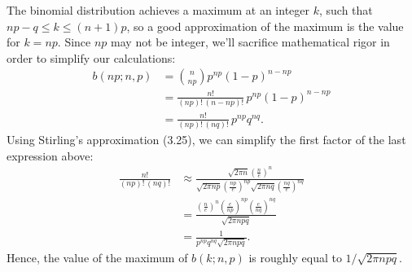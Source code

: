 The binomial distribution achieves a maximum at an integer $k$, such that $np-q\le k\le(n+1)p$, so a good approximation of the maximum is the value for $k=np$.
Since $np$ may not be integer, we'll sacrifice mathematical rigor in order to simplify our calculations:
\begin{align*}
    b(np;n,p) &= \binom{n}{np}p^{np}(1-p)^{n-np} \\
    &= \frac{n!}{(np)!\,(n-np)!}\,p^{np}(1-p)^{n-np} \\[1mm]
    &= \frac{n!}{(np)!\,(nq)!}\,p^{np}q^{nq}.
\end{align*}
Using Stirling's approximation (3.25), we can simplify the first factor of the last expression above:
\begin{align*}
    \frac{n!}{(np)!\,(nq)!} &\approx \frac{\sqrt{2\pi n}\left(\frac{n}{e}\right)^n}{\sqrt{2\pi np}\left(\frac{np}{e}\right)^{np}\sqrt{2\pi nq}\left(\frac{nq}{e}\right)^{nq}} \\[1mm]
    &= \frac{\left(\frac{n}{e}\right)^n\left(\frac{e}{np}\right)^{np}\left(\frac{e}{nq}\right)^{nq}}{\sqrt{2\pi npq}} \\[1mm]
    &= \frac{1}{p^{np}q^{nq}\sqrt{2\pi npq}}.
\end{align*}
Hence, the value of the maximum of $b(k;n,p)$ is roughly equal to $1/\sqrt{2\pi npq}$.
